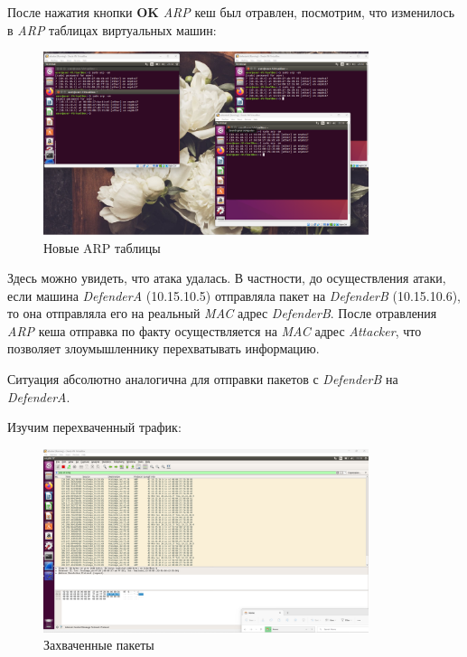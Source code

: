 \documentclass[a4paper]{article}
\begin{document}
  После нажатия кнопки \textbf{OK} \textit{ARP} кеш был отравлен, посмотрим, что изменилось
  в \textit{ARP} таблицах виртуальных машин:

  \begin{figure}[H]
    \centering
    \includegraphics[width=0.85\textwidth]{02_00 (57)}
    \caption{Новые ARP таблицы}
    \label{img:0044}
  \end{figure}

  Здесь можно увидеть, что атака удалась. В частности, до осуществления атаки, если машина 
  \textit{DefenderA} (10.15.10.5) отправляла пакет на \textit{DefenderB} (10.15.10.6),
  то она отправляла его на реальный \textit{MAC} адрес \textit{DefenderB}.
  После отравления \textit{ARP} кеша отправка по факту осуществляется на \textit{MAC} адрес \textit{Attacker},
  что позволяет злоумышленнику перехватывать информацию.

  Ситуация абсолютно аналогична для отправки пакетов с \textit{DefenderB} на \textit{DefenderA}.

  Изучим перехваченный трафик:

  \begin{figure}[H]
    \centering
    \includegraphics[width=0.85\textwidth]{02_00 (58)}
    \caption{Захваченные пакеты}
    \label{img:0045}
  \end{figure}
\end{document}
